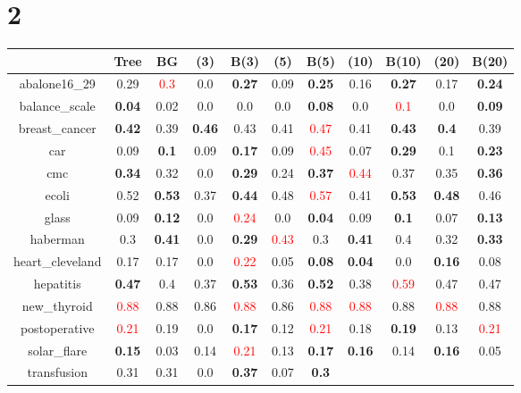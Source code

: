 \documentclass{article}%
\begin{document}
\section*{2}%
\begin{tabular}{c|cccccccccc}%
\hline%
&Tree&BG&(3)&B(3)&(5)&B(5)&(10)&B(10)&(20)&B(20)\\%
\hline%
abalone16\_29&0.29&\textcolor{red}{ 
0.3
}&0.0&\textbf{0.27}&0.09&\textbf{0.25}&0.16&\textbf{0.27}&0.17&\textbf{0.24}\\%
\hline%
balance\_scale&\textbf{0.04}&0.02&0.0&0.0&0.0&\textbf{0.08}&0.0&\textcolor{red}{ 
0.1
}&0.0&\textbf{0.09}\\%
\hline%
breast\_cancer&\textbf{0.42}&0.39&\textbf{0.46}&0.43&0.41&\textcolor{red}{ 
0.47
}&0.41&\textbf{0.43}&\textbf{0.4}&0.39\\%
\hline%
car&0.09&\textbf{0.1}&0.09&\textbf{0.17}&0.09&\textcolor{red}{ 
0.45
}&0.07&\textbf{0.29}&0.1&\textbf{0.23}\\%
\hline%
cmc&\textbf{0.34}&0.32&0.0&\textbf{0.29}&0.24&\textbf{0.37}&\textcolor{red}{ 
0.44
}&0.37&0.35&\textbf{0.36}\\%
\hline%
ecoli&0.52&\textbf{0.53}&0.37&\textbf{0.44}&0.48&\textcolor{red}{ 
0.57
}&0.41&\textbf{0.53}&\textbf{0.48}&0.46\\%
\hline%
glass&0.09&\textbf{0.12}&0.0&\textcolor{red}{ 
0.24
}&0.0&\textbf{0.04}&0.09&\textbf{0.1}&0.07&\textbf{0.13}\\%
\hline%
haberman&0.3&\textbf{0.41}&0.0&\textbf{0.29}&\textcolor{red}{ 
0.43
}&0.3&\textbf{0.41}&0.4&0.32&\textbf{0.33}\\%
\hline%
heart\_cleveland&0.17&0.17&0.0&\textcolor{red}{ 
0.22
}&0.05&\textbf{0.08}&\textbf{0.04}&0.0&\textbf{0.16}&0.08\\%
\hline%
hepatitis&\textbf{0.47}&0.4&0.37&\textbf{0.53}&0.36&\textbf{0.52}&0.38&\textcolor{red}{ 
0.59
}&0.47&0.47\\%
\hline%
new\_thyroid&\textcolor{red}{ 
0.88
}&0.88&0.86&\textcolor{red}{ 
0.88
}&0.86&\textcolor{red}{ 
0.88
}&\textcolor{red}{ 
0.88
}&0.88&\textcolor{red}{ 
0.88
}&0.88\\%
\hline%
postoperative&\textcolor{red}{ 
0.21
}&0.19&0.0&\textbf{0.17}&0.12&\textcolor{red}{ 
0.21
}&0.18&\textbf{0.19}&0.13&\textcolor{red}{ 
0.21
}\\%
\hline%
solar\_flare&\textbf{0.15}&0.03&0.14&\textcolor{red}{ 
0.21
}&0.13&\textbf{0.17}&\textbf{0.16}&0.14&\textbf{0.16}&0.05\\%
\hline%
transfusion&0.31&0.31&0.0&\textbf{0.37}&0.07&\textbf{0.3}&\textcolor{red}{ 
}
\end{tabular}
\end{document}
